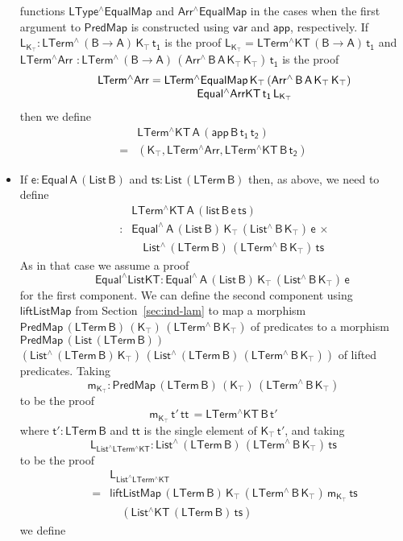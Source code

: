 \documentclass[sigplan,screen]{acmart}
\begin{document}
\begin{itemize}
  functions $\mathsf{LType^\wedge EqualMap}$ and $\mathsf{Arr^\wedge
    EqualMap}$ in the cases when the first argument to
  $\mathsf{PredMap}$ is constructed using $\mathsf{var}$ and
  $\mathsf{app}$, respectively. If $\mathsf{L_{K_\top} :
    LTerm^{\wedge}\, (B \to A) \, K_\top\, t_1}$ is the proof
  $\mathsf{L_{K_\top} = LTerm^\wedge KT\, (B \to A)\, t_1}$ and
  $\mathsf{ LTerm^\wedge Arr}$ $\mathsf{: LTerm^{\wedge}\, (B \to A)\,
    (Arr^{\wedge} \, B\, A\, K_\top \, K_\top)\, t_1}$ is the proof
  \[\begin{array}{l}
   \quad\quad  \mathsf{LTerm^\wedge Arr = LTerm^\wedge
    EqualMap\,K_\top\,(Arr^{\wedge}\,B\,A\,K_\top\,K_\top)}\\
  \hspace*{1.5in} \mathsf{Equal^\wedge ArrKT\, t_1\, L_{K_\top}}
  \end{array}\]
  then we define
  \[\begin{array}{ll}
    & \mathsf{LTerm^\wedge KT\,A\, (app\, B\, t_1\, t_2)} \\
  = & \mathsf{(K_\top ,  LTerm^\wedge Arr , LTerm^\wedge KT\,B\,t_2)}
    \end{array}\]
\item If $\mathsf{e : Equal\,A\,(List\,B)}$ and $\mathsf{ts :
  List\,(LTerm\, B)}$ then, as above, we need to define
  \[\begin{array}{ll}
  & \!\!\mathsf{LTerm^\wedge KT\,A\, (list\, B \,e\, ts)}\\
\quad\quad : & \!\!\mathsf{Equal^{\wedge} \, A\, (List\,B)\, K_\top\,
  (List^{\wedge} \, B\, K_\top) \, e\, \times}\\
 & \quad\mathsf{List^{\wedge}\, (LTerm\,B)
  \, (LTerm^{\wedge} \, B\, K_\top) \, ts }
  \end{array}\]
  As in that case we assume a proof
  \[\;\;\quad\mathsf{Equal^\wedge ListKT : Equal^{\wedge} \, A\, (List\,B)\, K_\top\,
  (List^{\wedge} \, B\, K_\top) \, e}\] for the first component.  We
  can define the second component using $\mathsf{liftListMap}$ from
  Section~\ref{sec:ind-lam} to map a morphism $\mathsf{PredMap\,
    (LTerm\,B)\, (K_\top)\, (LTerm^{\wedge}\,B\,K_\top)}$ of
  predicates to a morphism $\mathsf{PredMap\,(List\,(LTerm\,B))}$
  $\mathsf{(List^{\wedge}\,(LTerm\,B)\,K_\top) \,
    (List^{\wedge}\,(LTerm\,B)\, (LTerm^{\wedge}\,B\,K_\top))}$ of
  lifted predicates.  Taking
  \[\mathsf{m_{K_\top} : PredMap\,
    (LTerm\,B) \, (K_\top)\, (LTerm^{\wedge}\,B\,K_\top)}\] to be the
  proof \[\mathsf{m_{K_\top} \, t'\, tt\, = LTerm^\wedge KT\, B\, t'}\]
  where $\mathsf{t' : LTerm\,B}$ and $\mathsf{tt}$ is the single
  element of $\mathsf{K_\top\, t'}$, and taking
  \[\mathsf{L_{List^\wedge LTerm^\wedge KT} : List^{\wedge}\,
    (LTerm\,B) \, (LTerm^{\wedge} \, B\, K_\top) \, ts}\] to be the
  proof
\[\begin{array}{ll}
& \!\!\mathsf{ L_{List^\wedge LTerm^\wedge KT}}\\
\quad\quad= & 
 \!\!\mathsf{liftListMap \, (LTerm\,B) \, K_\top \, (LTerm^{\wedge}\,
   B\, K_\top) \, m_{K_\top} \, ts}\\
 & \!\!\quad \mathsf{(List^\wedge KT\, (LTerm\, B)\,
   ts) }
\end{array}\]
we define


\end{itemize}
\end{document}
